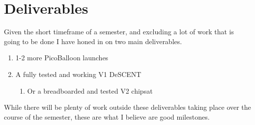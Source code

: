 \section{Deliverables}
Given the short timeframe of a semester, and excluding a lot of work that is going to be done I have honed in on two main deliverables.
\begin{enumerate}
    \item 1-2 more PicoBalloon launches
    \item A fully tested and working V1 DeSCENT \begin{enumerate}
        \item Or a breadboarded and tested V2 chipsat
    \end{enumerate}
\end{enumerate}

While there will be plenty of work outside these deliverables taking place over the course of the semester, these are what I believe are good milestones. 